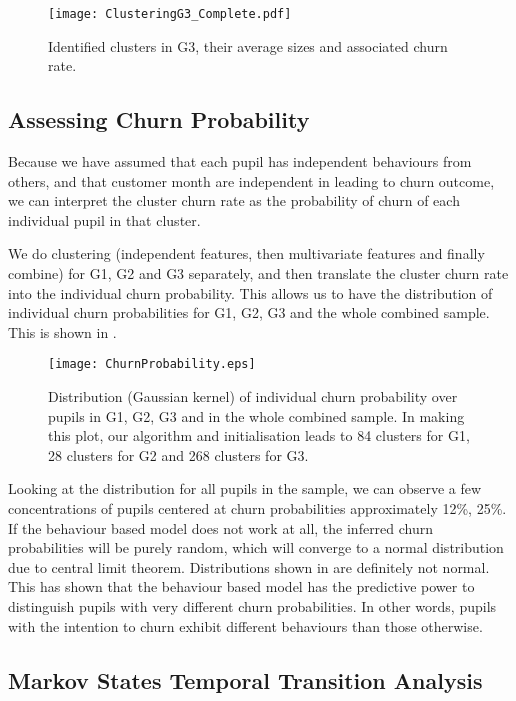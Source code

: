 \begin{figure}[!h]
\centering
\texttt{[image: ClusteringG3\_Complete.pdf]}
\caption{Identified clusters in G3, their average sizes and associated churn rate.}
\label{fig:clusteringG3Complete}
\end{figure}

\subsection{Assessing Churn Probability}

Because we have assumed that each pupil has independent behaviours from others, and that customer month are independent in leading to churn outcome, we can interpret the cluster churn rate as the probability of churn of each individual pupil in that cluster.

We do clustering (independent features, then multivariate features and finally combine) for G1, G2 and G3 separately, and then translate the cluster churn rate into the individual churn probability. This allows us to have the distribution of individual churn probabilities for G1, G2, G3 and the whole combined sample. This is shown in .

\begin{figure}[!h]
\centering
\texttt{[image: ChurnProbability.eps]}
\caption{Distribution (Gaussian kernel) of individual churn probability over pupils in G1, G2, G3 and in the whole combined sample. In making this plot, our algorithm and initialisation leads to 84 clusters for G1, 28 clusters for G2 and 268 clusters for G3.}
\label{fig:churnProb}
\end{figure}

Looking at the distribution for all pupils in the sample, we can observe a few concentrations of pupils centered at churn probabilities approximately 12\%, 25\%. If the behaviour based model does not work at all, the inferred churn probabilities will be purely random, which will converge to a normal distribution due to central limit theorem. Distributions shown in  are definitely not normal. This has shown that the behaviour based model has the predictive power to distinguish pupils with very different churn probabilities. In other words, pupils with the intention to churn exhibit different behaviours than those otherwise.

\subsection{Markov States Temporal Transition Analysis}

